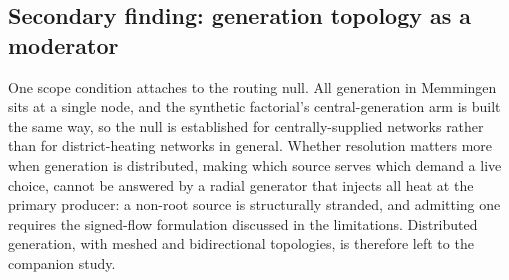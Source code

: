 \documentclass[a4paper,fleqn]{cas-sc}
\newcommand{\new}[1]{\textcolor[HTML]{1A5FB4}{#1}}   %
\newcommand{\new}[1]{#1}
\begin{document}
\new{}

\subsection{Secondary finding: generation topology as a moderator}
One scope condition attaches to the routing null. All generation in Memmingen sits at a
single node, and the synthetic factorial's central-generation arm is built the same way, so
the null is established for centrally-supplied networks rather than for district-heating
networks in general. Whether resolution matters more when generation is distributed, making
which source serves which demand a live choice, cannot be answered by a radial generator
that injects all heat at the primary producer: a non-root source is structurally stranded,
and admitting one requires the signed-flow formulation discussed in the limitations.
Distributed generation, with meshed and bidirectional topologies, is therefore left to the
companion study.
\end{document}
